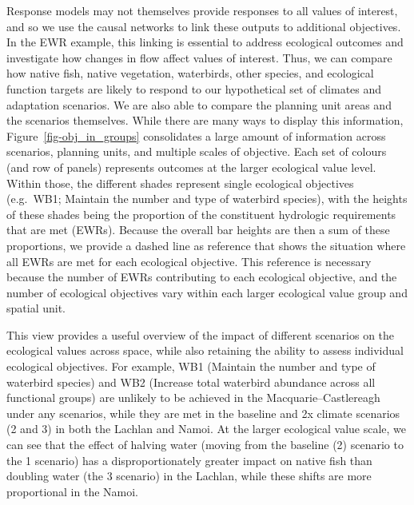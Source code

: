 \documentclass[
  number]{elsarticle}
\begin{document}
Response models may not themselves provide responses to all values of
interest, and so we use the causal networks to link these outputs to
additional objectives. In the EWR example, this linking is essential to
address ecological outcomes and investigate how changes in flow affect
values of interest. Thus, we can compare how native fish, native
vegetation, waterbirds, other species, and ecological function targets
are likely to respond to our hypothetical set of climates and adaptation
scenarios. We are also able to compare the planning unit areas and the
scenarios themselves. While there are many ways to display this
information, Figure~\ref{fig-obj_in_groups} consolidates a large amount
of information across scenarios, planning units, and multiple scales of
objective. Each set of colours (and row of panels) represents outcomes
at the larger ecological value level. Within those, the different shades
represent single ecological objectives (e.g.~WB1; Maintain the number
and type of waterbird species), with the heights of these shades being
the proportion of the constituent hydrologic requirements that are met
(EWRs). Because the overall bar heights are then a sum of these
proportions, we provide a dashed line as reference that shows the
situation where all EWRs are met for each ecological objective. This
reference is necessary because the number of EWRs contributing to each
ecological objective, and the number of ecological objectives vary
within each larger ecological value group and spatial unit.

This view provides a useful overview of the impact of different
scenarios on the ecological values across space, while also retaining
the ability to assess individual ecological objectives. For example, WB1
(Maintain the number and type of waterbird species) and WB2 (Increase
total waterbird abundance across all functional groups) are unlikely to
be achieved in the Macquarie--Castlereagh under any scenarios, while
they are met in the baseline and 2x climate scenarios (2 and 3) in both
the Lachlan and Namoi. At the larger ecological value scale, we can see
that the effect of halving water (moving from the baseline (2) scenario
to the 1 scenario) has a disproportionately greater impact on native
fish than doubling water (the 3 scenario) in the Lachlan, while these
shifts are more proportional in the Namoi.
\end{document}
